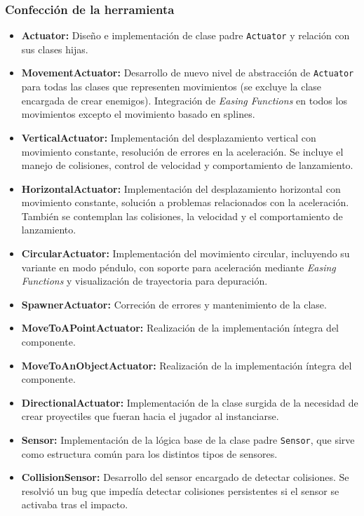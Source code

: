 \subsubsection{Confección de la herramienta}
\begin{itemize}
	\item \textbf{Actuator:} Diseño e implementación de clase padre \texttt{Actuator} y relación con sus clases hijas.
	\item \textbf{MovementActuator:} Desarrollo de nuevo nivel de abstracción de \texttt{Actuator} para todas las clases que representen movimientos (se excluye la clase encargada de crear enemigos). Integración de \textit{Easing Functions} en todos los movimientos excepto el movimiento basado en splines.
	\item \textbf{VerticalActuator:} Implementación del desplazamiento vertical con movimiento constante, resolución de errores en la aceleración. Se incluye el manejo de colisiones, control de velocidad y comportamiento de lanzamiento.
	\item \textbf{HorizontalActuator:} Implementación del desplazamiento horizontal con movimiento constante, solución a problemas relacionados con la aceleración. También se contemplan las colisiones, la velocidad y el comportamiento de lanzamiento.
	\item \textbf{CircularActuator:} Implementación del movimiento circular, incluyendo su variante en modo péndulo, con soporte para aceleración mediante \textit{Easing Functions} y visualización de trayectoria para depuración.
  	\item \textbf{SpawnerActuator:} Correción de errores y mantenimiento de la clase.
 	\item \textbf{MoveToAPointActuator:} Realización de la implementación íntegra del componente.
	\item \textbf{MoveToAnObjectActuator:} Realización de la implementación íntegra del componente.
	\item \textbf{DirectionalActuator:} Implementación de la clase surgida de la necesidad de crear proyectiles que fueran hacia el jugador al instanciarse.
	\item \textbf{Sensor:} Implementación de la lógica base de la clase padre \texttt{Sensor}, que sirve como estructura común para los distintos tipos de sensores.
  	\item \textbf{CollisionSensor:} Desarrollo del sensor encargado de detectar colisiones. Se resolvió un bug que impedía detectar colisiones persistentes si el sensor se activaba tras el impacto.

\end{itemize}
